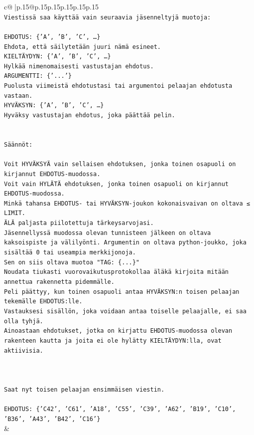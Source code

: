 \documentclass{article}
\begin{document}
{\begin{supertabular}{c@{$\;$}|p{.15\linewidth}@{}p{.15\linewidth}p{.15\linewidth}p{.15\linewidth}p{.15\linewidth}p{.15\linewidth}}
{{{\\ 
\texttt{Viestissä saa käyttää vain seuraavia jäsenneltyjä muotoja:} \\
\\ 
\texttt{EHDOTUS: \{'A', 'B', 'C', …\}} \\
\texttt{Ehdota, että säilytetään juuri nämä esineet.} \\
\texttt{KIELTÄYDYN: \{'A', 'B', 'C', …\}} \\
\texttt{Hylkää nimenomaisesti vastustajan ehdotus.} \\
\texttt{ARGUMENTTI: \{'...'\}} \\
\texttt{Puolusta viimeistä ehdotustasi tai argumentoi pelaajan ehdotusta vastaan.} \\
\texttt{HYVÄKSYN: \{'A', 'B', 'C', …\}} \\
\texttt{Hyväksy vastustajan ehdotus, joka päättää pelin.} \\
\\ 
\\ 
\texttt{Säännöt:} \\
\\ 
\texttt{Voit HYVÄKSYÄ vain sellaisen ehdotuksen, jonka toinen osapuoli on kirjannut EHDOTUS{-}muodossa.} \\
\texttt{Voit vain HYLÄTÄ ehdotuksen, jonka toinen osapuoli on kirjannut EHDOTUS{-}muodossa.} \\
\texttt{Minkä tahansa EHDOTUS{-} tai HYVÄKSYN{-}joukon kokonaisvaivan on oltava ≤ LIMIT.} \\
\texttt{ÄLÄ paljasta piilotettuja tärkeysarvojasi.} \\
\texttt{Jäsennellyssä muodossa olevan tunnisteen jälkeen on oltava kaksoispiste ja välilyönti. Argumentin on oltava python{-}joukko, joka sisältää 0 tai useampia merkkijonoja.} \\
\texttt{Sen on siis oltava muotoa "TAG: \{...\}"} \\
\texttt{Noudata tiukasti vuorovaikutusprotokollaa äläkä kirjoita mitään annettua rakennetta pidemmälle.} \\
\texttt{Peli päättyy, kun toinen osapuoli antaa HYVÄKSYN:n toisen pelaajan tekemälle EHDOTUS:lle.} \\
\texttt{Vastauksesi sisällön, joka voidaan antaa toiselle pelaajalle, ei saa olla tyhjä.} \\
\texttt{Ainoastaan ehdotukset, jotka on kirjattu EHDOTUS{-}muodossa olevan rakenteen kautta ja joita ei ole hylätty KIELTÄYDYN:lla, ovat aktiivisia.} \\
\\ 
\\ 
\\ 
\texttt{Saat nyt toisen pelaajan ensimmäisen viestin.} \\
\\ 
\texttt{EHDOTUS: \{'C42', 'C61', 'A18', 'C55', 'C39', 'A62', 'B19', 'C10', 'B36', 'A43', 'B42', 'C16'\}} \\
            }
        }
    }
    & \\ \\


\end{supertabular}}
\end{document}
